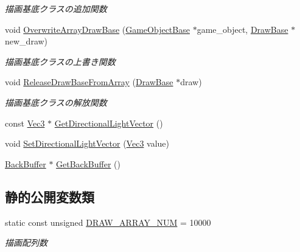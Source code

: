 \begin{DoxyCompactItemize}
\begin{DoxyCompactList}\small\item\em 描画基底クラスの追加関数 \end{DoxyCompactList}\item 
void \mbox{\hyperlink{class_draw_manager_a94ef5a241c8d78187a2a6c0ed3c9efec}{Overwrite\+Array\+Draw\+Base}} (\mbox{\hyperlink{class_game_object_base}{Game\+Object\+Base}} $\ast$game\+\_\+object, \mbox{\hyperlink{class_draw_base}{Draw\+Base}} $\ast$new\+\_\+draw)
\begin{DoxyCompactList}\small\item\em 描画基底クラスの上書き関数 \end{DoxyCompactList}\item 
void \mbox{\hyperlink{class_draw_manager_a287d1f359b87f075b22df6a9b6e99316}{Release\+Draw\+Base\+From\+Array}} (\mbox{\hyperlink{class_draw_base}{Draw\+Base}} $\ast$draw)
\begin{DoxyCompactList}\small\item\em 描画基底クラスの解放関数 \end{DoxyCompactList}\item 
const \mbox{\hyperlink{_vector3_d_8h_ab16f59e4393f29a01ec8b9bbbabbe65d}{Vec3}} $\ast$ \mbox{\hyperlink{class_draw_manager_a952023ad9e2e12844c93e37029a32700}{Get\+Directional\+Light\+Vector}} ()
\item 
void \mbox{\hyperlink{class_draw_manager_a470edae8248d36956a02bab7e59a4140}{Set\+Directional\+Light\+Vector}} (\mbox{\hyperlink{_vector3_d_8h_ab16f59e4393f29a01ec8b9bbbabbe65d}{Vec3}} value)
\item 
\mbox{\hyperlink{class_back_buffer}{Back\+Buffer}} $\ast$ \mbox{\hyperlink{class_draw_manager_a0e7e11e650f1c1736e9d3199a58191a7}{Get\+Back\+Buffer}} ()
\end{DoxyCompactItemize}
\subsection*{静的公開変数類}
\begin{DoxyCompactItemize}
\item 
static const unsigned \mbox{\hyperlink{class_draw_manager_ad4326cddcb1cc4cec198c4f8069b81f0}{D\+R\+A\+W\+\_\+\+A\+R\+R\+A\+Y\+\_\+\+N\+UM}} = 10000
\begin{DoxyCompactList}\small\item\em 描画配列数 \end{DoxyCompactList}\end{DoxyCompactItemize}
